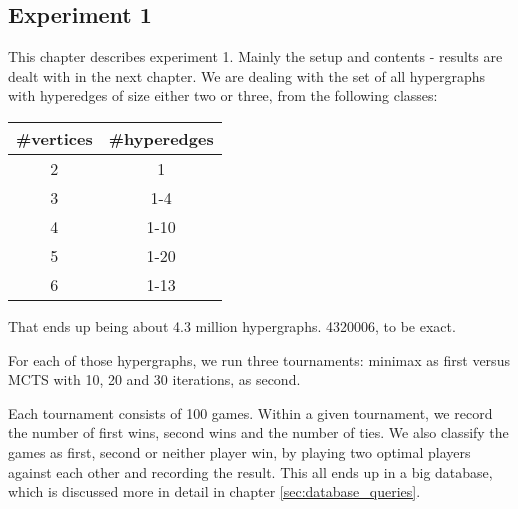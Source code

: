 \subsection{Experiment 1}
\label{sec:experiment1}

This chapter describes experiment 1. Mainly the setup and contents - results are dealt with in the next chapter.
We are dealing with the set of all hypergraphs with hyperedges of size either two or three, from the following classes:

\begin{tabular}{ c | c }
\#vertices & \#hyperedges \\ \hline
2&1 \\ \hline
3&1-4 \\ \hline
4&1-10 \\ \hline
5&1-20 \\ \hline
6&1-13 \\ \hline
\end{tabular}

That ends up being about 4.3 million hypergraphs. 4320006, to be exact.

For each of those hypergraphs, we run three tournaments: minimax as first versus MCTS with 10, 20 and 30 iterations, as second.

Each tournament consists of 100 games. Within a given tournament, we record the number of first wins, second wins and the number of ties.
We also classify the games as first, second or neither player win, by playing two optimal players against each other and recording the result.
This all ends up in a big database, which is discussed more in detail in chapter \ref{sec:database_queries}.
